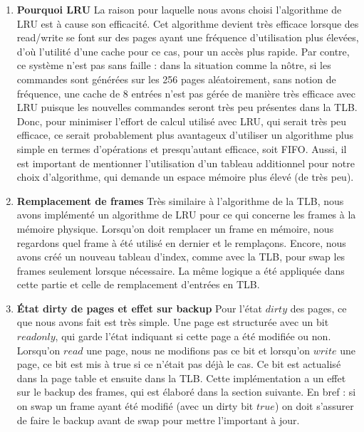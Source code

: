 \documentclass[12pt]{article}
\begin{document}
\begin{enumerate}
\item \textbf{Pourquoi LRU}
\newline
La raison pour laquelle nous avons choisi l'algorithme de LRU est à cause son efficacité. Cet algorithme devient très efficace lorsque des read/write se font sur des pages ayant une fréquence d'utilisation plus élevées, d'où l'utilité d'une cache pour ce cas, pour un accès plus rapide. Par contre, ce système n'est pas sans faille : dans la situation comme la nôtre, si les commandes sont générées sur les 256 pages aléatoirement, sans notion de fréquence, une cache de 8 entrées n'est pas gérée de manière très efficace avec LRU puisque les nouvelles commandes seront très peu présentes dans la TLB. Donc, pour minimiser l'effort de calcul utilisé avec LRU, qui serait très peu efficace, ce serait probablement plus avantageux d'utiliser un algorithme plus simple en termes d'opérations et presqu'autant efficace, soit FIFO. Aussi, il est important de mentionner l'utilisation d'un tableau additionnel pour notre choix d'algorithme, qui demande un espace mémoire plus élevé (de très peu).

\item \textbf{Remplacement de frames}
\newline
Très similaire à l'algorithme de la TLB, nous avons implémenté un algorithme de LRU pour ce qui concerne les frames à la mémoire physique. Lorsqu'on doit remplacer un frame en mémoire, nous regardons quel frame à été utilisé en dernier et le remplaçons. Encore, nous avons créé un nouveau tableau d'index, comme avec la TLB, pour swap les frames seulement lorsque nécessaire. La même logique a été appliquée dans cette partie et celle de remplacement d'entrées en TLB. 

\item \textbf{État dirty de pages et effet sur backup}
\newline
Pour l'état $dirty$ des pages, ce que nous avons fait est très simple. Une page est structurée avec un bit $readonly$, qui garde l'état indiquant si cette page a été modifiée ou non. Lorsqu'on $read$ une page, nous ne modifions pas ce bit et lorsqu'on $write$ une page, ce bit est mis à true si ce n'était pas déjà le cas. Ce bit est actualisé dans la page table et ensuite dans la TLB. Cette implémentation a un effet sur le backup des frames, qui est élaboré dans la section suivante. En bref : si on swap un frame ayant été modifié (avec un dirty bit $true$) on doit s'assurer de faire le backup avant de swap pour mettre l'important à jour.


\end{enumerate}
\end{document}
